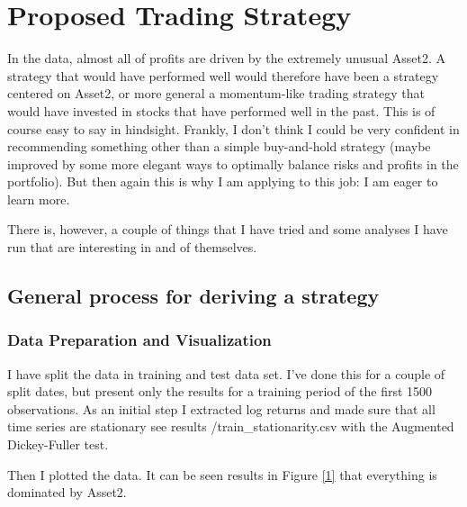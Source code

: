 

\chapter{Proposed Trading Strategy}

In the data, almost all of profits are driven by the extremely unusual Asset2. A strategy that would have performed well would therefore have been a strategy centered on Asset2, or more general a momentum-like trading strategy that would have invested in stocks that have performed well in the past. This is of course easy to say in hindsight. Frankly, I don't think I could be very confident in recommending something other than a simple buy-and-hold strategy (maybe improved by some more elegant ways to optimally balance risks and profits in the portfolio). But then again this is why I am applying to this job: I am eager to learn more. 

There is, however, a couple of things that I have tried and some analyses I have run that are interesting in and of themselves. 

\section{General process for deriving a strategy}
\subsection{Data Preparation and Visualization}
I have split the data in training and test data set. I've done this for a couple of split dates, but present only the results for a training period of the first 1500 observations. As an initial step I extracted log returns and made sure that all time series are stationary see results \slash train\_stationarity.csv with the Augmented Dickey-Fuller test. 

Then I plotted the data. It can be seen results in Figure \ref{1} that everything is dominated by Asset2. 

